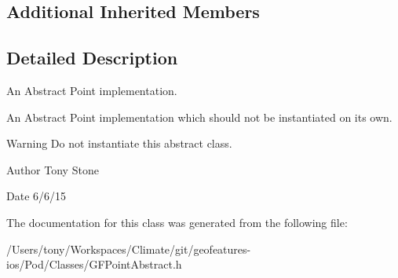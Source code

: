 \subsection*{Additional Inherited Members}


\subsection{Detailed Description}
An Abstract Point implementation. 

An Abstract Point implementation which should not be instantiated on it\textquotesingle{}s own.

\begin{DoxyWarning}{Warning}
Do not instantiate this abstract class.
\end{DoxyWarning}
\begin{DoxyAuthor}{Author}
Tony Stone 
\end{DoxyAuthor}
\begin{DoxyDate}{Date}
6/6/15 
\end{DoxyDate}


The documentation for this class was generated from the following file\+:\begin{DoxyCompactItemize}
\item 
/\+Users/tony/\+Workspaces/\+Climate/git/geofeatures-\/ios/\+Pod/\+Classes/G\+F\+Point\+Abstract.\+h\end{DoxyCompactItemize}
